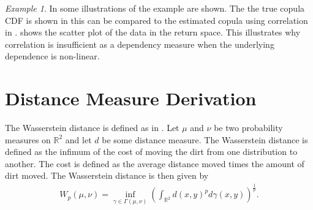 \documentclass[%
a4paper,							
11pt,								
bibliography=totoc,						
abstracton=true					
]
{scrartcl}
\theoremstyle{plain}
\theoremstyle{definition}
\theoremstyle{remark}
\newtheorem{example}[theorem]{Example}
\newcommand{\1}{\mathbbm{1}}
\begin{document}
\begin{example}
    In  some illustrations of the example are shown. The the true copula \gls{CDF} is shown in  this can be compared to the estimated copula using correlation in . %
     shows the scatter plot of the data in the return space. This illustrates why correlation is insufficient as a dependency measure when the underlying dependence is non-linear. 
    

\end{example}

\newpage
\section{Distance Measure Derivation}\label{sec:DistanceDerivation}
The Wasserstein distance is defined as in . Let $\mu$ and $\nu$ be two probability measures on $\mathbb{R}^2$ and let $d$ be some distance measure. The Wasserstein distance is defined as the infimum of the cost of moving the dirt from one distribution to another. The cost is defined as the average distance moved times the amount of dirt moved. The Wasserstein distance is then given by
\begin{align*}
    W_p(\mu,\nu) = \inf_{\gamma \in \Gamma(\mu,\nu)} \left( \int_{\mathbb{R}^2} d(x,y)^p d\gamma(x,y) \right)^{\frac{1}{p}}.
\end{align*}
\end{document}
